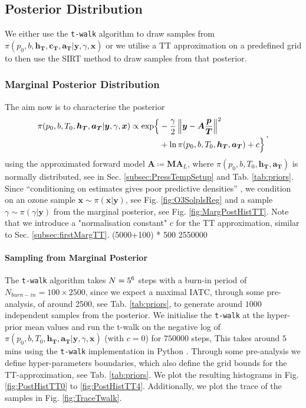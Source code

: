 \subsection{Posterior Distribution}

We either use the \texttt{t-walk} algorithm \cite{christen2010general} to draw samples from $\pi(p_0,b,\bm{h_T},\bm{c_T},\bm{a_T} | \bm{y}, \gamma, \bm{x})$ or we utilise a TT approximation on a predefined grid to then use the SIRT method to draw samples from that posterior.


\subsubsection{Marginal Posterior Distribution}



The aim now is to characterise the posterior
\begin{align}
	\begin{split}
		\pi(p_0,b,T_0,\bm{h_T},\bm{a_T} | \bm{y}, \gamma, \bm{x}) \propto  \exp\Bigl\{ & -\frac{\gamma}{2} \left\Vert \bm{y}- \bm{A} \frac{\bm{p}}{\bm{T}}  \right\Vert^2 \\ &+ \ln{\pi(p_0,b,T_0,\bm{h_T},\bm{a_T})  + c \Bigr\}  }
	\end{split} \, ,
	\label{eq:postPT}
\end{align}
using the approximated forward model $\bm{A} \coloneqq \bm{M}\bm{A}_L$, where $\pi(p_0,b,T_0,\bm{h_T},\bm{a_T})$ is normally distributed, see in Sec. \ref{subsec:PressTempSetup} and Tab. \ref{tab:priors}.
Since “conditioning on estimates gives poor predictive densities” \cite{tan2016LecNot}, we condition on an ozone sample $\bm{x} \sim \pi(\bm{x}|\bm{y})$, see Fig. \ref{fig:O3SolplsReg} and a sample $\gamma \sim \pi(\gamma| \bm{y})$ from the marginal posterior, see Fig. \ref{fig:MargPostHistTT}.
Note that we introduce a "normalisation constant" $c$ for the TT approximation, similar to Sec. \ref{subsec:firstMargTT}.
(5000+100) * 500
2550000
\paragraph{Sampling from Marginal Posterior}
The \texttt{t-walk} \cite{christen2010general} algorithm takes $N = 5 \time 10^6$ steps with a burn-in period of $N_{burn-in} = 100 \times 2500 $, since we expect a maximal IATC, through some pre-analysis, of around 2500, see Tab. \ref{tab:priors}, to generate around $1000$ independent samples from the posterior.
We initialise the \texttt{t-walk} at the hyper-prior mean values and run the t-walk on the negative log of $\pi(p_0,b,T_0,\bm{h_T},\bm{a_T} | \bm{y}, \gamma, \bm{x}) $ (with $c=0$) for $750000$ steps,
This takes around $5$ mins using the \texttt{t-walk} implementation in Python \cite{christentwalkaccess}.
Through some pre-analysis we define hyper-parameters boundaries, which also define the grid bounds for the TT-approximation, see Tab. \ref{tab:priors}.
We plot the resulting histograms in Fig. \ref{fig:PostHistTT0} to \ref{fig:PostHistTT4}.
Additionally, we plot the trace of the samples in Fig. \ref{fig:TraceTwalk}.

